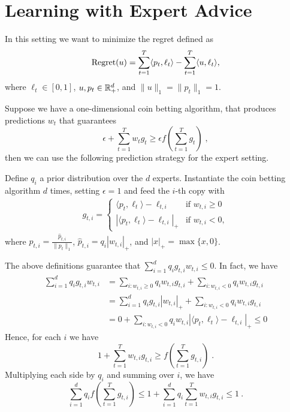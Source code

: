 \section{Learning with Expert Advice}

In this setting we want to minimize the regret defined as
\[
\operatorname{Regret}(u) = \sum_{t=1}^T \langle p_t, \ell_t \rangle - \sum_{t=1}^T \langle u, \ell_t \rangle,
\]
where $\ell_t \in [0,1]$, $u, p_t \in \mathbb{R}^d_+$, and $\|u\|_1 = \|p_t\|_1 = 1$.

Suppose we have a one-dimensional coin betting algorithm, that produces
predictions $w_t$ that guarantees
\[
\epsilon + \sum_{t=1}^T w_t g_t \ge \epsilon f(\sum_{t=1}^T g_t) \; ,
\]
then we can use the following prediction strategy for the expert setting.

Define $q_i$ a prior distribution over the $d$ experts. Instantiate the coin
betting algorithm $d$ times, setting $\epsilon =1$ and feed the $i$-th copy with
\begin{align}
g_{t,i} = \begin{cases}
\langle p_t, \ell_t\rangle - \ell_{t,i} & \text{if } w_{t,i} \ge 0 \\
|\langle p_t, \ell_t\rangle - \ell_{t,i}|_+ & \text{if } w_{t,i} < 0,
\end{cases}
\end{align}
where $p_{t,i} = \frac{\hat{p}_{t,i}}{\|p_{t}\|_1}$, $\hat{p}_{t,i}=q_i |w_{t,i}|_+$, and $|x|_+=\max\{x,0\}$.

The above definitions guarantee that $\sum_{i=1}^d q_i g_{t,i} w_{t,i} \le 0$. In fact, we have
\begin{align*}
\sum_{i=1}^d q_i g_{t,i} w_{t,i}
& = \sum_{i:w_{t,i}\ge 0} q_i w_{t,i} g_{t,i} + \sum_{i:w_{t,i} < 0} q_i w_{t,i} g_{t,i} \\
& = \sum_{i=1}^d q_i g_{t,i} |w_{t,i}|_+ + \sum_{i:w_{t,i} < 0} q_i w_{t,i} g_{t,i} \\
& = 0 + \sum_{i:w_{t,i} < 0} q_i w_{t,i} |\langle p_t, \ell_t\rangle - \ell_{t,i}|_+ \le 0
\end{align*}
Hence, for each $i$ we have
\[
1 + \sum_{t=1}^T w_{t,i} g_{t,i} \ge f \left( \sum_{t=1}^T g_{t,i} \right) \; .
\]
Multiplying each side by $q_i$ and summing over $i$, we have
\begin{equation}
\label{eq:bounded_potential}
\sum_{i=1}^d q_i f\left(\sum_{t=1}^T g_{t,i} \right) \le 1 + \sum_{i=1}^d q_i \sum_{t=1}^T w_{t,i} g_{t,i} \le 1~.
\end{equation}

